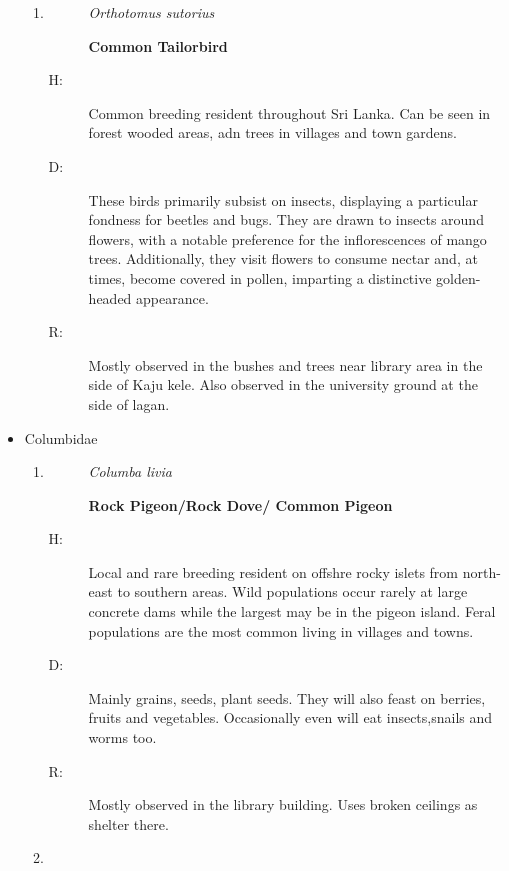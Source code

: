 \begin{itemize}
\begin{enumerate}
\item%
\begin{description}%
\item[]%
\textit{Orthotomus sutorius}%
\item[]%
\textbf{Common Tailorbird}%
\end{description}%
\begin{description}%
\item[H: ]%
Common breeding resident throughout Sri Lanka. Can be seen in forest wooded areas, adn trees in villages and town gardens.%
\item[D: ]%
These birds primarily subsist on insects, displaying a particular fondness for beetles and bugs. They are drawn to insects around flowers, with a notable preference for the inflorescences of mango trees. Additionally, they visit flowers to consume nectar and, at times, become covered in pollen, imparting a distinctive golden{-}headed appearance.%
\item[R: ]%
Mostly observed in the bushes and trees near library area in the side of Kaju kele. Also observed in the university ground at the side of lagan.%
\end{description}%
\end{enumerate}%
\item%
Columbidae%
\begin{enumerate}%
\item%
\begin{description}%
\item[]%
\textit{Columba livia}%
\item[]%
\textbf{Rock Pigeon/Rock Dove/ Common Pigeon}%
\end{description}%
\begin{description}%
\item[H: ]%
Local and rare breeding resident on offshre rocky islets from north{-}east to southern areas. Wild populations occur rarely at large concrete dams while the largest may be in the pigeon island. Feral populations are the most common living in villages and towns. %
\item[D: ]%
Mainly grains, seeds, plant seeds. They will also feast on berries, fruits and vegetables. Occasionally even will eat insects,snails and worms too.%
\item[R: ]%
Mostly observed in the library building. Uses broken ceilings as shelter there.%
\end{description}%
\item%
\begin{description}%

\end{description}
\end{enumerate}
\end{itemize}
